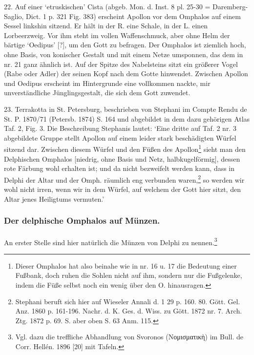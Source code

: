 \documentclass[a4paper, 11pt, oneside]{article}
\begin{document}
22. Auf einer `etruskischen' Cista (abgeb. Mon. d. Inst. 8 pl. 25-30 = Daremberg-Saglio, Dict. 1 p. 321 Fig. 383) erscheint Apollon vor dem Omphalos auf einem Sessel linkshin sitzend. Er hält in der R. eine Schale, in der L. einen Lorbeerzweig. Vor ihm steht im vollen Waffenschmuck, aber ohne Helm der bärtige `Oedipus' [?], um den Gott zu befragen. Der Omphalos ist ziemlich hoch, ohne Basis, von konischer Gestalt und mit einem Netze umsponnen, das dem in nr. 21 ganz ähnlich ist. Auf der Spitze des Nabelsteins sitzt ein größerer Vogel (Rabe oder Adler) der seinen Kopf nach dem Gotte hinwendet. Zwischen Apollon und Oedipus erscheint im Hintergrunde eine vollkommen nackte, mir unverständliche Jünglingsgestalt, die sich dem Gott zuwendet.

23. Terrakotta in St. Petersburg, beschrieben von Stephani im Compte Rendu de St. P. 1870/71 (Petersb. 1874) S. 164 und abgebildet in dem dazu gehörigen Atlas Taf. 2, Fig. 3. Die Beschreibung Stephanis lautet: `Eine dritte auf Taf. 2 nr. 3 abgebildete Gruppe stellt Apollon auf einem leider stark beschädigten Würfel sitzend dar. Zwischen diesem Würfel und den Füßen des Apollon\footnote{Dieser Omphalos hat also beinahe wie in nr. 16 u. 17 die Bedeutung einer Fußbank, doch ruhen die Sohlen nicht auf ihm, sondern nur die Fußgelenke, indem die Füße selbst noch ein wenig über den O. hinausragen.} sieht man den Delphischen Omphalos [niedrig, ohne Basis und Netz, halbkugelförmig], dessen rote Färbung wohl erhalten ist; und da nicht bezweifelt werden kann, dass in Delphi der Altar und der Omph. räumlich eng verbunden waren,\footnote{Stephani beruft sich hier auf Wieseler Annali d. 1 29 p. 160. 80. Gött. Gel. Anz. 1860 p. 161-196. Nachr. d. K. Ges. d. Wiss. zu Gött. 1872 nr. 7. Arch. Ztg. 1872 p. 69. S. aber oben S. 63 Anm. 115.} so werden wir wohl nicht irren, wenn wir in dem Würfel, auf welchem der Gott hier sitzt, den Altar jenes Heiligtums vermuten.'

\subsubsection{Der delphische Omphalos auf Münzen.}
\paragraph{}
An erster Stelle sind hier natürlich die Münzen von Delphi zu nennen.\footnote{Vgl. dazu die treffliche Abhandlung von Svoronos (Νομισματικὴ) im Bull. de Corr. Hellén. 1896 [20] mit Tafeln.}
\end{document}
